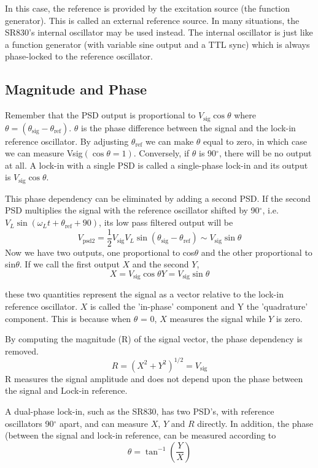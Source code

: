 \documentclass{../lab}
\begin{document}
In this case, the reference is provided by the excitation source (the function generator). This is called an external reference source. In many situations, the SR830's internal oscillator may be used instead. The internal oscillator is just like a function generator (with variable sine output and a TTL sync) which is always phase-locked to the reference oscillator.

\subsection{Magnitude and Phase}

Remember that the PSD output is proportional to $V_\text{sig} \cos \theta$ where $\theta = (\theta_\text{sig} - \theta_\text{ref})$. $\theta$ is the phase difference between the signal and the lock-in reference oscillator. By adjusting $\theta_\text{ref}$ we can make $\theta$ equal to zero, in which case we can measure Vsig$(\cos \theta = 1)$. Conversely, if $\theta$ is 90$^\circ$, there will be no output at all. A lock-in with a single PSD is called a single-phase lock-in and its output is $V_\text{sig} \cos \theta$.

This phase dependency can be eliminated by adding a second PSD. If the second PSD multiplies the signal with the reference oscillator shifted by 90$^\circ$, i.e. $V_L \sin(\omega_Lt + \theta_\text{ref} + 90)$, its low pass filtered output will be
\[
    V_\text{psd2} = \frac{1}{2} V_\text{sig} V_L \sin(\theta_\text{sig} - \theta_\text{ref}) \sim V_\text{sig} \sin \theta
\]
Now we have two outputs, one proportional to cos$\theta$ and the other proportional to sin$\theta$. If we call the first output $X$ and the second $Y$,
\[
    X = V_\text{sig} \cos \theta Y = V_\text{sig} \sin \theta
\]

these two quantities represent the signal as a vector relative to the lock-in reference oscillator. $X$ is called the 'in-phase' component and Y the 'quadrature' component. This is because when $\theta$ = 0, $X$ measures the signal while $Y$ is zero.

By computing the magnitude (R) of the signal vector, the phase dependency is removed.
\[
    R = (X^2 + Y^2)^{1/2} = V_\text{sig}
\]
R measures the signal amplitude and does not depend upon the phase between the signal and Lock-in reference.

A dual-phase lock-in, such as the SR830, has two PSD's, with reference oscillators 90$^\circ$ apart, and can measure $X$, $Y$ and $R$ directly. In addition, the phase (between the signal and lock-in reference, can be measured according to
\[
    \theta = \tan^{-1} \left(\frac{Y}{X} \right)
\]
\end{document}
